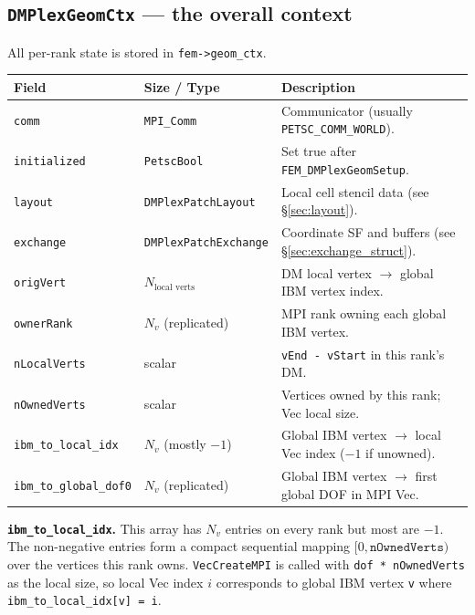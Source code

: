 \documentclass[11pt]{article}
\begin{document}
\subsection{\texttt{DMPlexGeomCtx} --- the overall context}

All per-rank state is stored in \texttt{fem->geom\_ctx}.

\begin{center}
\begin{tabular}{lll}
\toprule
Field & Size / Type & Description \\
\midrule
\texttt{comm}              & \texttt{MPI\_Comm}    & Communicator (usually \texttt{PETSC\_COMM\_WORLD}). \\
\texttt{initialized}       & \texttt{PetscBool}    & Set true after \texttt{FEM\_DMPlexGeomSetup}. \\
\texttt{layout}            & \texttt{DMPlexPatchLayout} & Local cell stencil data (see \S\ref{sec:layout}). \\
\texttt{exchange}          & \texttt{DMPlexPatchExchange} & Coordinate SF and buffers (see \S\ref{sec:exchange_struct}). \\
\texttt{origVert}          & $N_\text{local verts}$ & DM local vertex $\to$ global IBM vertex index. \\
\texttt{ownerRank}         & $N_v$ (replicated)    & MPI rank owning each global IBM vertex. \\
\texttt{nLocalVerts}       & scalar                & \texttt{vEnd - vStart} in this rank's DM. \\
\texttt{nOwnedVerts}       & scalar                & Vertices owned by this rank; Vec local size. \\
\texttt{ibm\_to\_local\_idx}  & $N_v$ (mostly $-1$) & Global IBM vertex $\to$ local Vec index ($-1$ if unowned). \\
\texttt{ibm\_to\_global\_dof0}& $N_v$ (replicated)  & Global IBM vertex $\to$ first global DOF in MPI Vec. \\
\bottomrule
\end{tabular}
\end{center}

\textbf{\texttt{ibm\_to\_local\_idx}.}
This array has $N_v$ entries on every rank but most are $-1$.  The non-negative
entries form a compact sequential mapping $[0, \texttt{nOwnedVerts})$ over the
vertices this rank owns.  \texttt{VecCreateMPI} is called with
\texttt{dof * nOwnedVerts} as the local size, so local Vec index $i$ corresponds
to global IBM vertex \texttt{v} where \texttt{ibm\_to\_local\_idx[v] = i}.
\end{document}
